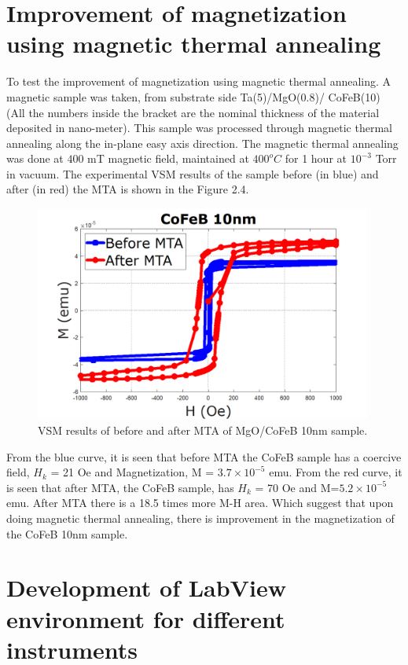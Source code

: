 \documentclass[12pt,a4paper,bold]{thesis}
\theoremstyle{thm}
\theoremstyle{definition}
\begin{document}
\section{Improvement of magnetization using magnetic thermal annealing}
\indent\indent\indent To test the improvement of magnetization using magnetic thermal annealing. A magnetic sample was taken, from substrate side Ta(5)/MgO(0.8)/ CoFeB(10) (All the numbers inside the bracket are the nominal thickness of the material deposited in nano-meter). This sample was processed through magnetic thermal annealing along the in-plane easy axis direction. The magnetic thermal annealing was done at $400$ mT magnetic field, maintained at $400^oC$ for 1 hour at $10^{-3}$ Torr in vacuum. The experimental VSM results of the sample before (in blue) and after (in red) the MTA is shown in the Figure 2.4.
\begin{figure}[H]
	\centering
   \includegraphics[height=7.1cm]{Images/37.png} 
   \caption{VSM results of before and after MTA of MgO/CoFeB 10nm sample.}
\end{figure}
\indent\indent From the blue curve, it is seen that before MTA the CoFeB sample has a coercive field, $H_k$ = 21 Oe and Magnetization, M = $3.7\times10^{-5}$ emu. From the red curve, it is seen that after MTA, the CoFeB sample, has $H_k$ = 70 Oe and M=$5.2 \times 10^{-5}$ emu. After MTA there is a 18.5 times more M-H area. Which suggest that upon doing magnetic thermal annealing, there is improvement in the magnetization of the CoFeB 10nm sample.

\section{Development of LabView environment for different instruments}
\end{document}
